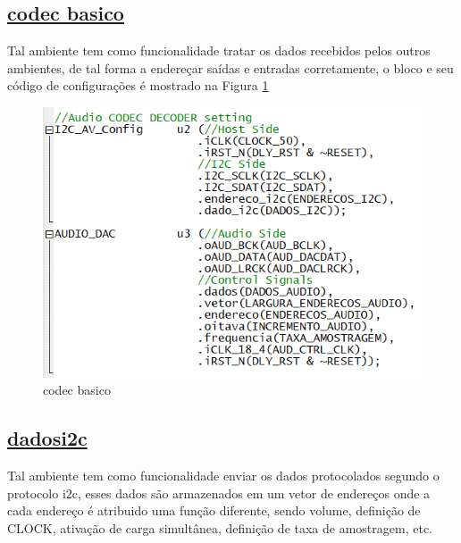 \documentclass[14pt, oneside]{book}
\theoremstyle{definition}
\begin{document}
                \subsection[codec basico]{\hyperlink{toc}{codec basico}}
                    Tal ambiente tem como funcionalidade tratar os dados recebidos pelos outros ambientes, de tal forma a endereçar saídas e entradas corretamente, o bloco e seu código de configurações é mostrado na Figura \ref{fig:codecbasico}
                    
                    \begin{figure}[!h]
                        \centering
                        \includegraphics[scale=1]{config.png}
                        \caption{codec basico}
                        \label{fig:codecbasico}
                    \end{figure}
                
                \subsection[dadosi2c]{\hyperlink{toc}{dadosi2c}}
                    Tal ambiente tem como funcionalidade enviar os dados protocolados segundo o protocolo i2c, esses dados são armazenados em um vetor de endereços onde a cada endereço é atribuido uma função diferente, sendo volume, definição de CLOCK, ativação de carga simultânea, definição de taxa de amostragem, etc.
                    
\end{document}
